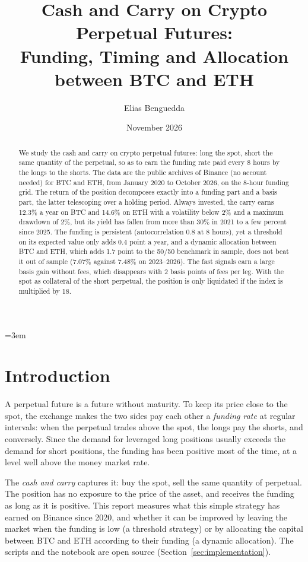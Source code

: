 \documentclass[11pt,a4paper]{article}
\title{Cash and Carry on Crypto Perpetual Futures:\\
Funding, Timing and Allocation between BTC and ETH}
\author{Elias Benguedda}
\date{November 2026}
\begin{document}
\emergencystretch=3em
\maketitle

\begin{abstract}
We study the cash and carry on crypto perpetual futures: long the spot, short the same quantity of the perpetual, so
as to earn the funding rate paid every 8 hours by the longs to the shorts. The data are the public archives of
Binance (no account needed) for BTC and ETH, from January 2020 to October 2026, on the 8-hour funding grid. The
return of the position decomposes exactly into a funding part and a basis part, the latter telescoping over a
holding period. Always invested, the carry earns 12.3\% a year on BTC and 14.6\% on ETH with a volatility below 2\%
and a maximum drawdown of 2\%, but its yield has fallen from more than 30\% in 2021 to a few percent since 2025. The
funding is persistent (autocorrelation 0.8 at 8 hours), yet a threshold on its expected value only adds 0.4 point a
year, and a dynamic allocation between BTC and ETH, which adds 1.7 point to the 50/50 benchmark in sample, does not
beat it out of sample (7.07\% against 7.48\% on 2023--2026). The fast signals earn a large basis gain without fees,
which disappears with 2 basis points of fees per leg. With the spot as collateral of the short perpetual, the position
is only liquidated if the index is multiplied by 18.
\end{abstract}

\clearpage
\tableofcontents
\newpage

\section{Introduction}
A perpetual future is a future without maturity. To keep its price close to the spot, the exchange makes the two
sides pay each other a \emph{funding rate} at regular intervals: when the perpetual trades above the spot, the longs
pay the shorts, and conversely. Since the demand for leveraged long positions usually exceeds the demand for short
positions, the funding has been positive most of the time, at a level well above the money market rate.

The \emph{cash and carry} captures it: buy the spot, sell the same quantity of perpetual. The position has no
exposure to the price of the asset, and receives the funding as long as it is positive. This report measures what
this simple strategy has earned on Binance since 2020, and whether it can be improved by leaving the market when the
funding is low (a threshold strategy) or by allocating the capital between BTC and ETH according to their funding (a
dynamic allocation). The scripts and the notebook are open source (Section~\ref{sec:implementation}).
\end{document}
